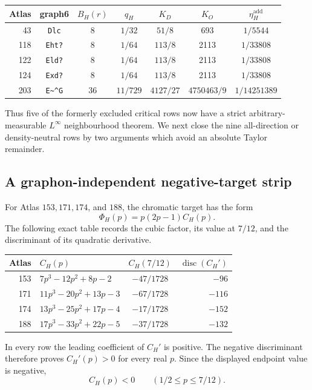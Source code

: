 \documentclass[11pt]{article}
\begin{document}
\begin{center}
\begin{tabular}{r|c|c|c|c|c|c}
Atlas&graph6&$B_H(r)$&$q_H$&$K_D$&$K_O$&$\eta_H^{\mathrm{add}}$\\ \hline
43&\verb|Dlc|&8&$1/32$&$51/8$&693&$1/5544$\\
118&\verb|Eht?|&8&$1/64$&$113/8$&2113&$1/33808$\\
122&\verb|Eld?|&8&$1/64$&$113/8$&2113&$1/33808$\\
124&\verb|Exd?|&8&$1/64$&$113/8$&2113&$1/33808$\\
203&\verb|E~^G|&36&$11/729$&$4127/27$&$4750463/9$&$1/14251389$
\end{tabular}
\end{center}

Thus five of the formerly excluded critical rows now have a strict
arbitrary-measurable $L^\infty$ neighbourhood theorem.  We next close the
nine all-direction or density-neutral rows by two arguments which avoid an
absolute Taylor remainder.

\subsection{A graphon-independent negative-target strip}

For Atlas $153,171,174$, and $188$, the chromatic target has the form
\begin{equation}
 \Phi_H(p)=p(2p-1)C_H(p).
 \label{eq:negative-target-factor}
\end{equation}
The following exact table records the cubic factor, its value at $7/12$,
and the discriminant of its quadratic derivative.
\begin{center}
\begin{tabular}{r|l|c|r}
Atlas&$C_H(p)$&$C_H(7/12)$&$\operatorname{disc}(C_H')$\\ \hline
153&$7p^3-12p^2+8p-2$&$-47/1728$&$-96$\\
171&$11p^3-20p^2+13p-3$&$-67/1728$&$-116$\\
174&$13p^3-25p^2+17p-4$&$-17/1728$&$-152$\\
188&$17p^3-33p^2+22p-5$&$-37/1728$&$-132$
\end{tabular}
\end{center}
In every row the leading coefficient of $C_H'$ is positive.  The negative
discriminant therefore proves $C_H'(p)>0$ for every real $p$.  Since the
displayed endpoint value is negative,
\begin{equation}
 C_H(p)<0\qquad(1/2\leq p\leq7/12).
 \label{eq:negative-target-strip}
\end{equation}
\end{document}
